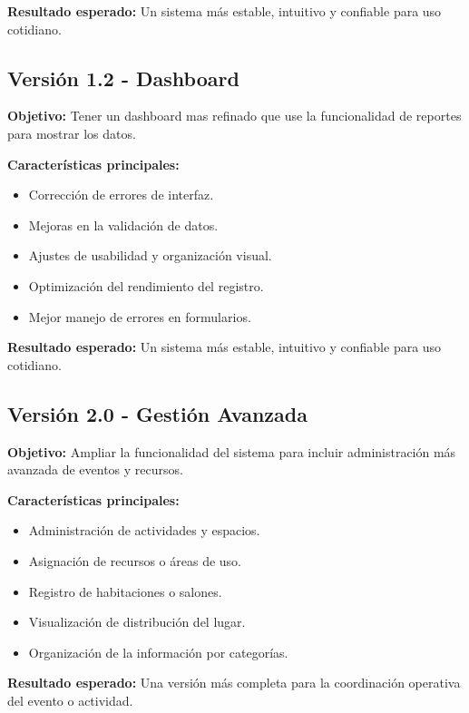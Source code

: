 \documentclass[11pt,a4paper]{article}
\begin{document}
\textbf{Resultado esperado:}\newline
Un sistema más estable, intuitivo y confiable para uso cotidiano.

\subsection{Versión 1.2 - Dashboard}
\textbf{Objetivo:}\newline
Tener un dashboard mas refinado que use la funcionalidad de reportes para mostrar los datos.

\textbf{Características principales:}
\begin{itemize}[leftmargin=1.5em]
	\item Corrección de errores de interfaz.
	\item Mejoras en la validación de datos.
	\item Ajustes de usabilidad y organización visual.
	\item Optimización del rendimiento del registro.
	\item Mejor manejo de errores en formularios.
\end{itemize}

\textbf{Resultado esperado:}\newline
Un sistema más estable, intuitivo y confiable para uso cotidiano.

\subsection{Versión 2.0 - Gestión Avanzada}
\textbf{Objetivo:}\newline
Ampliar la funcionalidad del sistema para incluir administración más avanzada de eventos y recursos.

\textbf{Características principales:}
\begin{itemize}[leftmargin=1.5em]
    \item Administración de actividades y espacios.
    \item Asignación de recursos o áreas de uso.
    \item Registro de habitaciones o salones.
    \item Visualización de distribución del lugar.
    \item Organización de la información por categorías.
\end{itemize}

\textbf{Resultado esperado:}\newline
Una versión más completa para la coordinación operativa del evento o actividad.
\end{document}
